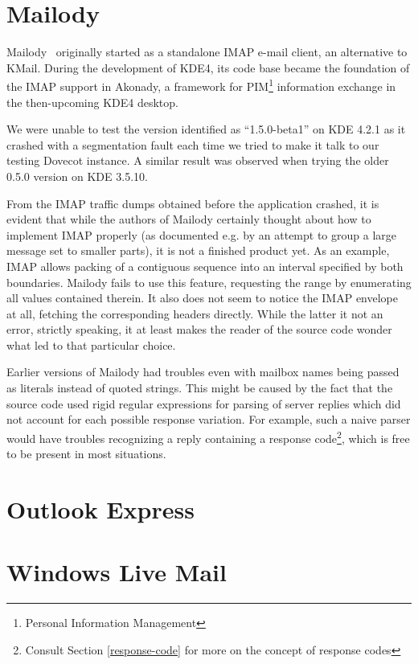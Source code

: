 \documentclass[12pt,notitlepage]{report}
\begin{document}
\section{Mailody}

Mailody~\cite{mailody} originally started as a standalone IMAP e-mail client, an
alternative to KMail.  During the development of KDE4, its code base became the
foundation of the IMAP support in Akonady, a framework for
PIM\footnote{Personal Information Management} information exchange in the
then-upcoming KDE4 desktop.

We were unable to test the version identified as ``1.5.0-beta1'' on KDE 4.2.1 as
it crashed with a segmentation fault each time we tried to make it talk to our
testing Dovecot instance.  A similar result was observed when trying the older
0.5.0 version on KDE 3.5.10.

From the IMAP traffic dumps obtained before the application crashed, it is evident that while the authors
of Mailody certainly thought about how to implement IMAP properly (as documented e.g.
by an attempt to group a large message set to smaller parts), it is not a
finished product yet.  As an example, IMAP allows packing of a contiguous sequence into
an interval specified by both boundaries.  Mailody fails to use this feature,
requesting the range by enumerating all values contained therein.  It also does not seem to notice
the IMAP envelope at all, fetching the corresponding headers directly.  While
the latter it not an error, strictly speaking, it at least makes the reader of
the source code wonder what led to that particular choice.

Earlier versions of Mailody had troubles even with mailbox names being passed as
literals instead of quoted strings.  This might be caused by the fact that the
source code used rigid regular expressions for parsing of server replies which
did not account for each possible response variation.  For example, such a naive
parser would have troubles recognizing a reply containing a response
code\footnote{Consult Section \ref{response-code} for more on the concept of
response codes}, which is free to be present in most situations.

\section{Outlook Express}


\section{Windows Live Mail}
\end{document}
